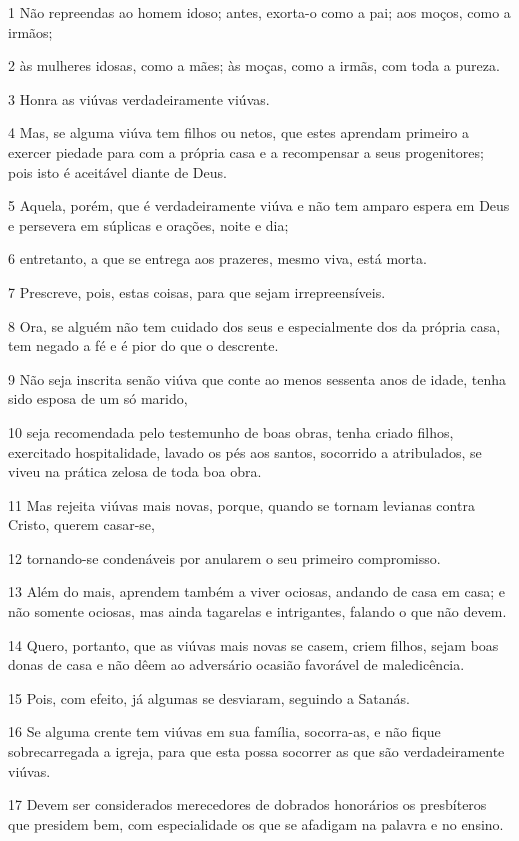 \par 1 Não repreendas ao homem idoso; antes, exorta-o como a pai; aos moços, como a irmãos;
\par 2 às mulheres idosas, como a mães; às moças, como a irmãs, com toda a pureza.
\par 3 Honra as viúvas verdadeiramente viúvas.
\par 4 Mas, se alguma viúva tem filhos ou netos, que estes aprendam primeiro a exercer piedade para com a própria casa e a recompensar a seus progenitores; pois isto é aceitável diante de Deus.
\par 5 Aquela, porém, que é verdadeiramente viúva e não tem amparo espera em Deus e persevera em súplicas e orações, noite e dia;
\par 6 entretanto, a que se entrega aos prazeres, mesmo viva, está morta.
\par 7 Prescreve, pois, estas coisas, para que sejam irrepreensíveis.
\par 8 Ora, se alguém não tem cuidado dos seus e especialmente dos da própria casa, tem negado a fé e é pior do que o descrente.
\par 9 Não seja inscrita senão viúva que conte ao menos sessenta anos de idade, tenha sido esposa de um só marido,
\par 10 seja recomendada pelo testemunho de boas obras, tenha criado filhos, exercitado hospitalidade, lavado os pés aos santos, socorrido a atribulados, se viveu na prática zelosa de toda boa obra.
\par 11 Mas rejeita viúvas mais novas, porque, quando se tornam levianas contra Cristo, querem casar-se,
\par 12 tornando-se condenáveis por anularem o seu primeiro compromisso.
\par 13 Além do mais, aprendem também a viver ociosas, andando de casa em casa; e não somente ociosas, mas ainda tagarelas e intrigantes, falando o que não devem.
\par 14 Quero, portanto, que as viúvas mais novas se casem, criem filhos, sejam boas donas de casa e não dêem ao adversário ocasião favorável de maledicência.
\par 15 Pois, com efeito, já algumas se desviaram, seguindo a Satanás.
\par 16 Se alguma crente tem viúvas em sua família, socorra-as, e não fique sobrecarregada a igreja, para que esta possa socorrer as que são verdadeiramente viúvas.
\par 17 Devem ser considerados merecedores de dobrados honorários os presbíteros que presidem bem, com especialidade os que se afadigam na palavra e no ensino.
